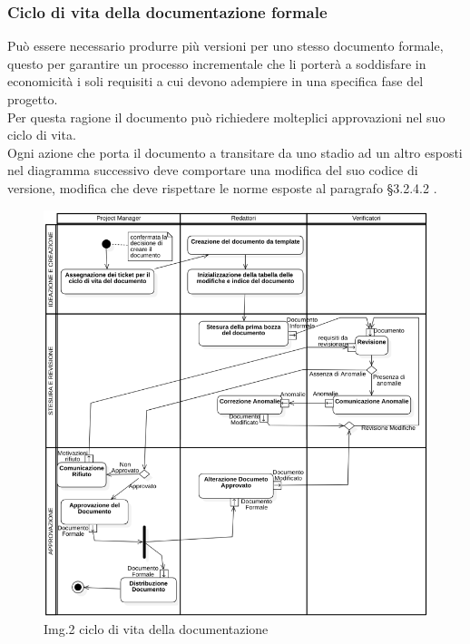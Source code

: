 		\subsubsection{Ciclo di vita della documentazione formale}
			Può essere necessario produrre più versioni per uno stesso documento formale, questo per garantire un processo incrementale che li porterà a soddisfare in economicità i soli requisiti a cui devono adempiere in una specifica fase del progetto.\\
			Per questa ragione il documento può richiedere molteplici approvazioni nel suo ciclo di vita.\\
			Ogni azione che porta il documento a transitare da uno stadio ad un altro esposti nel diagramma successivo deve comportare una modifica del suo codice di versione, modifica che deve rispettare le norme esposte al paragrafo §3.2.4.2 .\\
			\begin{figure}[H]
    				\centering
    				\includegraphics[width=1.0\textwidth]{res/images/ciclo_di_vita.png}
				\caption{Img.2 ciclo di vita della documentazione}
				\label{fig:Img.2 ciclo di vita della documentazione}
			\end{figure}
